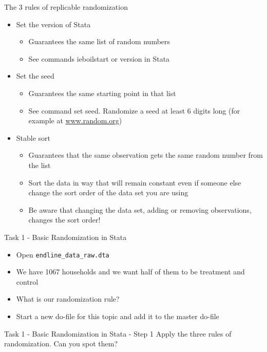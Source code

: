\documentclass[aspectratio=169]{beamer}
\newcommand{\codeexample}[2]{
	\begin{figure}
		\VerbatimInput[
		framesep=3mm,
		frame=lines, %
		numbers=left, %
		label= #1, %
		baselinestretch=0.90, %
		]{#2} %
	\end{figure}
	\FloatBarrier
}
\begin{document}
\begin{frame}{The 3 rules of replicable randomization}
	\begin{itemize}
		\item Set the version of Stata
		\begin{itemize}
			\item Guarantees the same list of random numbers
			\item See commands ieboilstart or version in Stata
		\end{itemize}
		\item Set the seed
		\begin{itemize}
			\item 	Guarantees the same starting point in that list
			\item See command set seed. Randomize a seed at least 6 digits long (for example at \url{www.random.org})
		\end{itemize}
		\item Stable sort
		\begin{itemize}
			\item Guarantees that the same observation gets the same random number from the list
			\item Sort the data in way that will remain constant even if someone else change the sort order of the data set you are using
			\item Be aware that changing the data set, adding or removing observations, changes the sort order!
		\end{itemize}
	\end{itemize}
\end{frame}



\begin{frame}{Task 1 - Basic Randomization in Stata}
	\begin{itemize}
		\item Open \texttt{endline\_data\_raw.dta}
		\item We have 1067 households and we want half of them to be treatment and control
		\item What is our randomization rule?
		\item Start a new do-file for this topic and add it to the master do-file
	\end{itemize}
\end{frame}

\begin{frame}{Task 1 - Basic Randomization in Stata - Step 1}
	Apply the three rules of randomization. Can you spot them?
	\codeexample{randomization-1.do}{code/randomization-1.do}
\end{frame}
\end{document}
